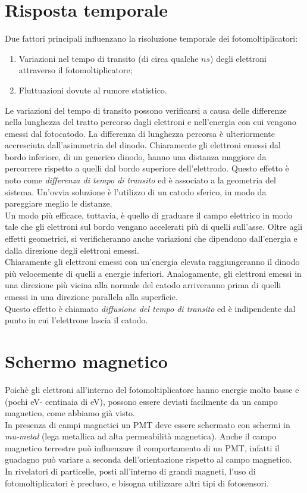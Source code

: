 \documentclass[12pt, letterpaper]{book}
\begin{document}
\newpage
\section{Risposta temporale}
Due fattori principali influenzano la risoluzione temporale dei fotomoltiplicatori:
\begin{enumerate}
    \item Variazioni nel tempo di transito (di circa qualche $ns$) degli elettroni attraverso il fotomoltiplicatore;
    \item Fluttuazioni dovute al rumore statistico.
\end{enumerate}
Le variazioni del tempo di transito possono verificarsi a causa delle differenze nella lunghezza del tratto percorso dagli elettroni e nell'energia con cui vengono emessi dal fotocatodo.
La differenza di lunghezza percorsa è ulteriormente accresciuta dall'asimmetria del dinodo. 
Chiaramente gli elettroni emessi dal bordo inferiore, di un generico dinodo, hanno una distanza maggiore da percorrere rispetto a quelli dal bordo superiore dell'elettrodo. Questo effetto è noto come \textit{differenza di tempo di transito} ed è associato a
la geometria del sistema.
Un'ovvia soluzione è l'utilizzo di un catodo sferico, in modo da pareggiare meglio le distanze.\\
Un modo più efficace, tuttavia, è quello di graduare il campo elettrico in modo tale che gli elettroni sul bordo vengano accelerati più di quelli sull'asse.
Oltre agli effetti geometrici, si verificheranno anche variazioni che dipendono dall'energia e dalla direzione degli elettroni emessi.\\
Chiaramente gli elettroni emessi con un'energia elevata raggiungeranno il dinodo più velocemente di quelli a energie inferiori. Analogamente, gli elettroni emessi in una direzione più vicina alla normale del catodo arriveranno prima di quelli emessi in una direzione parallela alla superficie.\\
Questo effetto è chiamato \textit{diffusione del tempo di transito} ed è indipendente dal punto in cui l'elettrone lascia il catodo.

\section{Schermo magnetico}
Poichè gli elettroni all'interno del fotomoltiplicatore hanno energie molto basse e (pochi eV- centinaia di eV), possono essere deviati facilmente da un campo magnetico, come abbiamo già visto.\\
In presenza di campi magnetici un PMT deve essere schermato con schermi in \textit{mu-metal} (lega metallica ad alta permeabilità magnetica). Anche il campo magnetico terrestre può influenzare il comportamento di un PMT, infatti il guadagno può variare a seconda dell’orientazione rispetto al campo magnetico.\\
In rivelatori di particelle, posti all’interno di grandi magneti, l’uso di fotomoltiplicatori 
è precluso, e bisogna utilizzare altri tipi di fotosensori.
\end{document}
